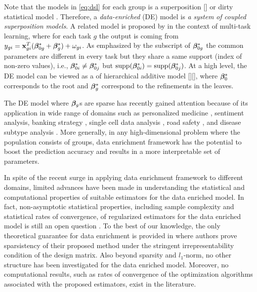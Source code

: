 Note that the models in \eqref{eq:dsl} for each group is a superposition \cite{guba16}[] or dirty statistical model \cite{yara13}.  Therefore, a {\em data-enriched}
(DE) model is \emph{a system of coupled superposition models}.
A related model is proposed by \cite{jrsr10} in the context of multi-task learning, where for each task $g$ the output is coming from $y_{gi} = \mathbf{x}_{gi}^T (\boldsymbol{\beta}_{0g}^* + \boldsymbol{\beta}^*_g) + \omega_{gi}$.
As emphasized by the subscript of $\boldsymbol{\beta}_{0g}^*$ the common parameters are different in every task but they share a same support (index of non-zero values), i.e., $\boldsymbol{\beta}_{0i}^* \neq \boldsymbol{\beta}_{0j}^*$ but $\text{supp}(\boldsymbol{\beta}_{0i}^*) = \text{supp}(\boldsymbol{\beta}_{0j}^*)$.  
At a high level, the DE model can be viewed as a
of hierarchical additive model [][], where $\boldsymbol{\beta}_0^*$ corresponds to the root and $\boldsymbol{\beta}_g^*$ correspond to the refinements in the leaves. 


The DE model where $\boldsymbol{\beta}_g$s are sparse has recently gained attention because of its application in wide range of domains such as personalized medicine \cite{domu16}, sentiment analysis, banking strategy \cite{grti16}, single cell data analysis \cite{olvi15}, road safety \cite{olvi14}, and disease subtype analysis \cite{domu16}.
More generally, in any high-dimensional problem where the population consists of groups, data enrichment framework has the potential to boost the prediction accuracy and results in a more interpretable set of parameters.

In spite of the recent surge in applying data enrichment framework to different domains, limited advances have been made in
understanding the statistical and computational properties of suitable estimators for the data enriched model.
In fact, non-asymptotic statistical properties, including sample complexity and statistical rates of convergence, of regularized estimators for the data enriched model is still an open question \cite{grti16, olvi14}.
To the best of our knowledge, the only theoretical guarantee for data enrichment is provided in \cite{olvi15} where authors prove sparsistency of their proposed method under the stringent irrepresentability condition of the design matrix.
Also beyond sparsity and $l_1$-norm, no other structure has been investigated for the data enriched model. Moreover, no computational results, such as rates of convergence of the optimization algorithms
associated with the proposed estimators, exist in the literature.

